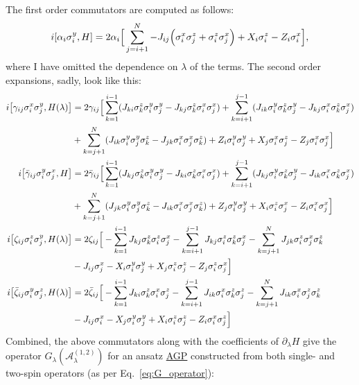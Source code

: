\documentclass[a4paper,oneside,11pt]{book}
\newcommand{\sx}{\sigma^x}
\newcommand{\sy}{\sigma^y}
\newcommand{\sz}{\sigma^z}
\newcommand{\dlambda}{\partial_{\lambda}}
\newcommand{\AGP}[1]{\mathcal{A}_{#1}}
\newcommand{\acrref}[1]{\hyperref[acr:#1]{#1}}
\begin{document}
The first order commutators are computed as follows:
\begin{equation}\label{eq:first_order_AGP_commutator}
        i\comm{\alpha_i \sy_i}{H} = 2\alpha_i \Big[ \sum_{j = i+1}^{N} - J_{ij} \Big( \sx_i \sz_j + \sz_i \sx_j \Big) + X_i \sz_i - Z_i \sx_i \Big],
\end{equation}
where I have omitted the dependence on $\lambda$ of the terms. The second order expansions, sadly, look like this:
\begin{equation}
    \begin{aligned}
        i\comm{\gamma_{ij} \sx_i \sy_j}{H(\lambda)} &= 2\gamma_{ij} \Big[ \sum_{k = 1}^{i-1} (J_{ki} \sz_k \sy_i \sy_j - J_{kj} \sz_k \sx_i \sx_j)  + \sum_{k = i + 1}^{j-1} (J_{ik} \sy_i \sz_k \sy_j - J_{kj} \sx_i \sz_k \sx_j) \\ 
        &+ \sum_{k = j + 1}^N (J_{ik} \sy_i \sy_j \sz_k - J_{jk} \sx_i \sx_j \sz_k) + Z_i \sy_i \sy_j + X_j \sx_i \sz_j - Z_j \sx_i \sx_j \Big] \\
        i\comm{\Bar{\gamma}_{ij} \sy_i \sx_j}{H} &= 2\Bar{\gamma}_{ij} \Big[ \sum_{k = 1}^{i-1} (J_{kj} \sz_k \sy_i \sy_j - J_{ki} \sz_k \sx_i \sx_j) + \sum_{k = i + 1}^{j-1} (J_{kj} \sy_i \sz_k \sy_j - J_{ik} \sx_i \sz_k \sx_j) \\ 
        &+ \sum_{k = j + 1}^N (J_{jk} \sy_i \sy_j \sz_k - J_{ik} \sx_i \sx_j \sz_k)+ Z_j \sy_i \sy_j + X_i \sz_i \sx_j - Z_i \sx_i \sx_j \Big] \\ 
        i\comm{\zeta_{ij} \sz_i \sy_j}{H(\lambda)} &= 2\zeta_{ij} \Big[ -\sum_{k = 1}^{i-1} J_{kj} \sz_k \sz_i \sx_j - \sum_{k = i + 1}^{j-1} J_{kj} \sz_i \sz_k \sx_j - \sum_{k = j + 1}^N J_{jk} \sz_i \sx_j \sz_k  \\
        &- J_{ij} \sx_j - X_i \sy_i \sy_j + X_j \sz_i \sz_j - Z_j \sz_i\sx_j \Big] \\
        i\comm{\Bar{\zeta}_{ij} \sy_i \sz_j}{H(\lambda)} &= 2\Bar{\zeta}_{ij} \Big[ - \sum_{k = 1}^{i-1} J_{ki} \sz_k \sx_i \sz_j - \sum_{k = i + 1}^{j-1} J_{ik} \sx_i \sz_k \sz_j 
        - \sum_{k = j + 1}^N J_{ik} \sx_i \sz_j \sz_k \\
        &- J_{ij} \sx_i - X_j \sy_i \sy_j + X_i \sz_i \sz_j - Z_i \sx_i \sz_j \Big]
    \end{aligned}
\end{equation}
Combined, the above commutators along with the coefficients of $\dlambda H$ give the operator $G_{\lambda}(\AGP{\lambda}^{(1,2)})$ for an ansatz \acrref{AGP} constructed from both single- and two-spin operators (as per Eq.~\eqref{eq:G_operator}):
\end{document}
